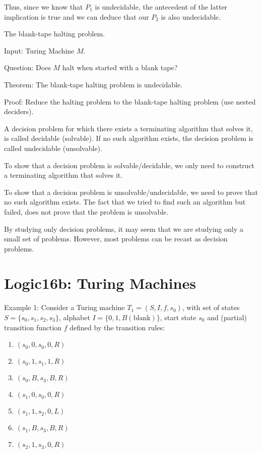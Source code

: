 \documentclass{article}
\begin{document}
Thus, since we know that $P_1$ is undecidable, the antecedent of the latter implication is true and we can deduce that our $P_2$ is also undecidable.

The blank-tape halting problem.

Input: Turing Machine $M$.

Question: Does $M$ halt when started with a blank tape?

Theorem: The blank-tape halting problem is undecidable.

Proof: Reduce the halting problem to the blank-tape halting problem (use nested deciders).

A decision problem for which there exists a terminating algorithm that solves it, is called decidable (solvable). If no such algorithm exists, the decision problem is called undecidable (unsolvable).

To show that a decision problem is solvable/decidable, we only need to construct a terminating algorithm that solves it.

To show that a decision problem is unsolvable/undecidable, we need to prove that no such algorithm exists. The fact that we tried to find such an algorithm but failed, does not prove that the problem is unsolvable.

By studying only decision problems, it may seem that we are studying only a small set of problems. However, most problems can be recast as decision problems.


\section{Logic16b: Turing Machines}

Example 1: Consider a Turing machine $T_1 = (S, I, f, s_0)$, with set of states $S = \{s_0, s_1, s_2, s_3\}$, alphabet $I = \{0,1, B(\text{blank})\}$, start state $s_0$ and (partial) transition function $f$ defined by the transition rules:
\begin{enumerate}
    \item $(s_0, 0, s_0, 0, R)$
    \item $(s_0, 1, s_1, 1, R)$
    \item $(s_0, B, s_3, B, R)$
    \item $(s_1, 0, s_0, 0, R)$
    \item $(s_1, 1, s_2, 0, L)$
    \item $(s_1, B, s_3, B, R)$
    \item $(s_2, 1, s_3, 0, R)$
\end{enumerate}
\end{document}
